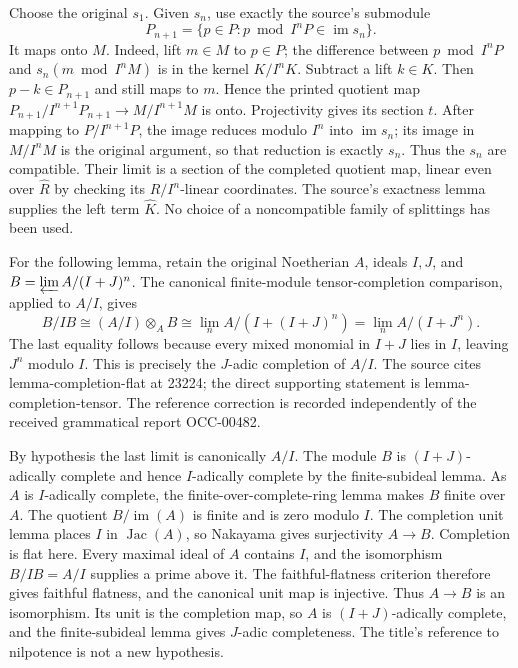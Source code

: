 Choose the original \(s_1\). Given \(s_n\), use exactly the source's submodule \[
P_{n+1}=\{p\in P:p\bmod I^nP\in\operatorname{im}s_n\}.
\] It maps onto \(M\). Indeed, lift \(m\in M\) to \(p\in P\); the difference between \(p\bmod I^nP\) and \(s_n(m\bmod I^nM)\) is in the kernel \(K/I^nK\). Subtract a lift \(k\in K\). Then \(p-k\in P_{n+1}\) and still maps to \(m\). Hence the printed quotient map \(P_{n+1}/I^{n+1}P_{n+1}\to M/I^{n+1}M\) is onto. Projectivity gives its section \(t\). After mapping to \(P/I^{n+1}P\), the image reduces modulo \(I^n\) into \(\operatorname{im}s_n\); its image in \(M/I^nM\) is the original argument, so that reduction is exactly \(s_n\). Thus the \(s_n\) are compatible. Their limit is a section of the completed quotient map, linear even over \(\widehat R\) by checking its \(R/I^n\)-linear coordinates. The source's exactness lemma supplies the left term \(\widehat K\). No choice of a noncompatible family of splittings has been used.

For the following lemma, retain the original Noetherian \(A\), ideals \(I,J\), and \(B=\varprojlim A/(I+J)^n\). The canonical finite-module tensor-completion comparison, applied to \(A/I\), gives \[
B/IB
 \cong (A/I)\otimes_A B
 \cong \lim_n A/(I+(I+J)^n)
 =\lim_n A/(I+J^n).
\] The last equality follows because every mixed monomial in \(I+J\) lies in \(I\), leaving \(J^n\) modulo \(I\). This is precisely the \(J\)-adic completion of \(A/I\). The source cites lemma-completion-flat at 23224; the direct supporting statement is lemma-completion-tensor. The reference correction is recorded independently of the received grammatical report OCC-00482.

By hypothesis the last limit is canonically \(A/I\). The module \(B\) is \((I+J)\)-adically complete and hence \(I\)-adically complete by the finite-subideal lemma. As \(A\) is \(I\)-adically complete, the finite-over-complete-ring lemma makes \(B\) finite over \(A\). The quotient \(B/\operatorname{im}(A)\) is finite and is zero modulo \(I\). The completion unit lemma places \(I\) in \(\operatorname{Jac}(A)\), so Nakayama gives surjectivity \(A\to B\). Completion is flat here. Every maximal ideal of \(A\) contains \(I\), and the isomorphism \(B/IB=A/I\) supplies a prime above it. The faithful-flatness criterion therefore gives faithful flatness, and the canonical unit map is injective. Thus \(A\to B\) is an isomorphism. Its unit is the completion map, so \(A\) is \((I+J)\)-adically complete, and the finite-subideal lemma gives \(J\)-adic completeness. The title's reference to nilpotence is not a new hypothesis.

